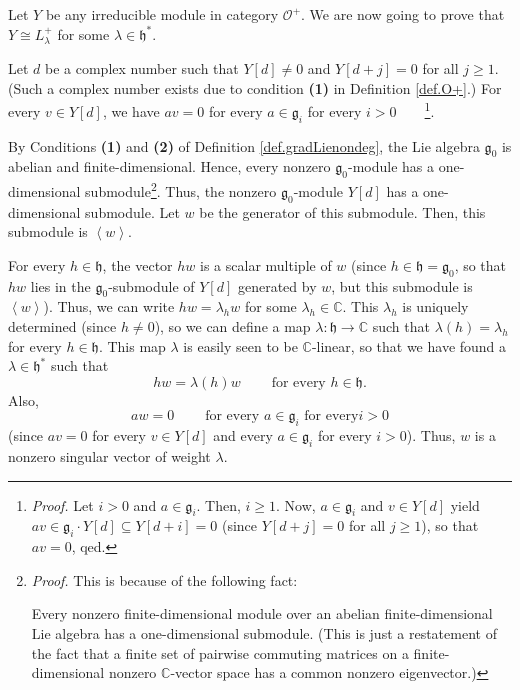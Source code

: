 \documentclass
[numbers=enddot,12pt,final,onecolumn,german,notitlepage]{scrartcl}%
\theoremstyle{definition}
\begin{document}
Let $Y$ be any irreducible module in category $\mathcal{O}^{+}$. We are now
going to prove that $Y\cong L_{\lambda}^{+}$ for some $\lambda\in
\mathfrak{h}^{\ast}$.

Let $d$ be a complex number such that $Y\left[  d\right]  \neq0$ and $Y\left[
d+j\right]  =0$ for all $j\geq1$. (Such a complex number exists due to
condition \textbf{(1)} in Definition \ref{def.O+}.) For every $v\in Y\left[
d\right]  $, we have $av=0$ for every $a\in\mathfrak{g}_{i}$ for every
$i>0$\ \ \ \ \footnote{\textit{Proof.} Let $i>0$ and $a\in\mathfrak{g}_{i}$.
Then, $i\geq1$. Now, $a\in\mathfrak{g}_{i}$ and $v\in Y\left[  d\right]  $
yield $av\in\mathfrak{g}_{i}\cdot Y\left[  d\right]  \subseteq Y\left[
d+i\right]  =0$ (since $Y\left[  d+j\right]  =0$ for all $j\geq1$), so that
$av=0$, qed.}.

By Conditions \textbf{(1)} and \textbf{(2)} of Definition
\ref{def.gradLienondeg}, the Lie algebra $\mathfrak{g}_{0}$ is abelian and
finite-dimensional. Hence, every nonzero $\mathfrak{g}_{0}$-module has a
one-dimensional submodule\footnote{\textit{Proof.} This is because of the
following fact:
\par
Every nonzero finite-dimensional module over an abelian finite-dimensional Lie
algebra has a one-dimensional submodule. (This is just a restatement of the
fact that a finite set of pairwise commuting matrices on a finite-dimensional
nonzero $\mathbb{C}$-vector space has a common nonzero eigenvector.)}. Thus,
the nonzero $\mathfrak{g}_{0}$-module $Y\left[  d\right]  $ has a
one-dimensional submodule. Let $w$ be the generator of this submodule. Then,
this submodule is $\left\langle w\right\rangle $.

For every $h\in\mathfrak{h}$, the vector $hw$ is a scalar multiple of $w$
(since $h\in\mathfrak{h}=\mathfrak{g}_{0}$, so that $hw$ lies in the
$\mathfrak{g}_{0}$-submodule of $Y\left[  d\right]  $ generated by $w$, but
this submodule is $\left\langle w\right\rangle $). Thus, we can write
$hw=\lambda_{h}w$ for some $\lambda_{h}\in\mathbb{C}$. This $\lambda_{h}$ is
uniquely determined (since $h\neq0$), so we can define a map $\lambda
:\mathfrak{h}\rightarrow\mathbb{C}$ such that $\lambda\left(  h\right)
=\lambda_{h}$ for every $h\in\mathfrak{h}$. This map $\lambda$ is easily seen
to be $\mathbb{C}$-linear, so that we have found a $\lambda\in\mathfrak{h}%
^{\ast}$ such that%
\[
hw=\lambda\left(  h\right)  w\ \ \ \ \ \ \ \ \ \ \text{for every }%
h\in\mathfrak{h}.
\]
Also,%
\[
aw=0\ \ \ \ \ \ \ \ \ \ \text{for every }a\in\mathfrak{g}_{i}\text{ for every
}i>0
\]
(since $av=0$ for every $v\in Y\left[  d\right]  $ and every $a\in
\mathfrak{g}_{i}$ for every $i>0$). Thus, $w$ is a nonzero singular vector of
weight $\lambda$.
\end{document}

